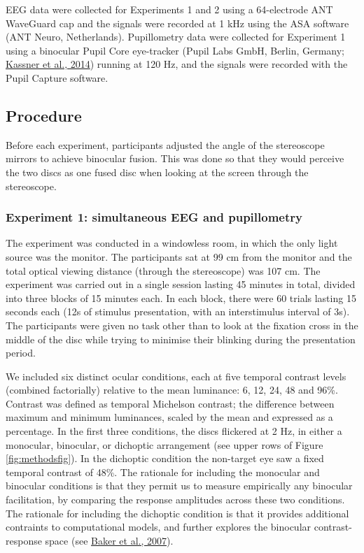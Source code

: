 \documentclass[
]{article}
\begin{document}
EEG data were collected for Experiments 1 and 2 using a 64-electrode ANT WaveGuard cap and the signals were recorded at 1 kHz using the ASA software (ANT Neuro, Netherlands). Pupillometry data were collected for Experiment 1 using a binocular Pupil Core eye-tracker (Pupil Labs GmbH, Berlin, Germany; \protect\hyperlink{ref-Kassner2014}{Kassner et al., 2014}) running at 120 Hz, and the signals were recorded with the Pupil Capture software.

\hypertarget{procedure}{%
\subsection{Procedure}\label{procedure}}

Before each experiment, participants adjusted the angle of the stereoscope mirrors to achieve binocular fusion. This was done so that they would perceive the two discs as one fused disc when looking at the screen through the stereoscope.

\hypertarget{experiment-1-simultaneous-eeg-and-pupillometry}{%
\subsubsection{Experiment 1: simultaneous EEG and pupillometry}\label{experiment-1-simultaneous-eeg-and-pupillometry}}

The experiment was conducted in a windowless room, in which the only light source was the monitor. The participants sat at 99 cm from the monitor and the total optical viewing distance (through the stereoscope) was 107 cm. The experiment was carried out in a single session lasting 45 minutes in total, divided into three blocks of 15 minutes each. In each block, there were 60 trials lasting 15 seconds each (12s of stimulus presentation, with an interstimulus interval of 3s). The participants were given no task other than to look at the fixation cross in the middle of the disc while trying to minimise their blinking during the presentation period.

We included six distinct ocular conditions, each at five temporal contrast levels (combined factorially) relative to the mean luminance: 6, 12, 24, 48 and 96\%. Contrast was defined as temporal Michelson contrast; the difference between maximum and minimum luminances, scaled by the mean and expressed as a percentage. In the first three conditions, the discs flickered at 2 Hz, in either a monocular, binocular, or dichoptic arrangement (see upper rows of Figure \ref{fig:methodsfig}). In the dichoptic condition the non-target eye saw a fixed temporal contrast of 48\%. The rationale for including the monocular and binocular conditions is that they permit us to measure empirically any binocular facilitation, by comparing the response amplitudes across these two conditions. The rationale for including the dichoptic condition is that it provides additional contraints to computational models, and further explores the binocular contrast-response space (see \protect\hyperlink{ref-Baker2007}{Baker et al., 2007}).
\end{document}

